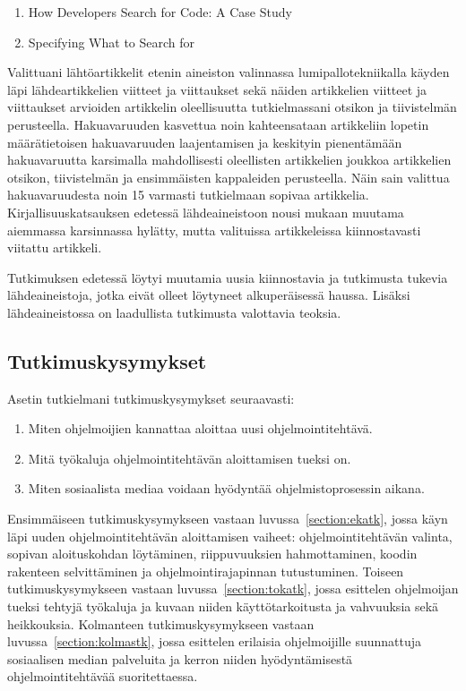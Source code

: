 \documentclass[finnish]{tktltiki2}
\theoremstyle{definition}
\theoremstyle{remark}
\begin{document}
\begin{enumerate}
  \item How Developers Search for Code: A Case Study~\cite{g_search_code}
  \item Specifying What to Search for~\cite{what-to-search-for}
\end{enumerate}
Valittuani lähtöartikkelit etenin aineiston valinnassa lumipallotekniikalla
käyden läpi lähdeartikkelien viitteet ja viittaukset sekä näiden artikkelien viitteet ja viittaukset arvioiden artikkelin oleellisuutta tutkielmassani otsikon ja tiivistelmän perusteella. Hakuavaruuden kasvettua noin kahteensataan artikkeliin lopetin määrätietoisen hakuavaruuden laajentamisen ja keskityin pienentämään hakuavaruutta karsimalla mahdollisesti oleellisten artikkelien joukkoa artikkelien otsikon, tiivistelmän ja ensimmäisten kappaleiden perusteella. Näin sain valittua hakuavaruudesta noin 15 varmasti tutkielmaan sopivaa artikkelia.  Kirjallisuuskatsauksen edetessä lähdeaineistoon nousi mukaan muutama aiemmassa karsinnassa hylätty, mutta valituissa artikkeleissa kiinnostavasti viitattu artikkeli.

Tutkimuksen edetessä löytyi muutamia uusia kiinnostavia ja tutkimusta tukevia lähdeaineistoja, jotka eivät olleet löytyneet alkuperäisessä haussa. Lisäksi lähdeaineistossa on laadullista tutkimusta valottavia teoksia.

\subsection{Tutkimuskysymykset}

Asetin tutkielmani tutkimuskysymykset seuraavasti:

\begin{enumerate}
  \item Miten ohjelmoijien kannattaa aloittaa uusi ohjelmointitehtävä.
  \item Mitä työkaluja ohjelmointitehtävän aloittamisen tueksi on.
  \item Miten sosiaalista mediaa voidaan hyödyntää ohjelmistoprosessin aikana.
\end{enumerate}
Ensimmäiseen tutkimuskysymykseen vastaan luvussa~\ref{section:ekatk}, jossa käyn läpi uuden ohjelmointitehtävän aloittamisen vaiheet: ohjelmointitehtävän valinta, sopivan aloituskohdan löytäminen, riippuvuuksien hahmottaminen, koodin rakenteen selvittäminen ja ohjelmointirajapinnan tutustuminen.
Toiseen tutkimuskysymykseen vastaan luvussa~\ref{section:tokatk}, jossa esittelen ohjelmoijan tueksi tehtyjä työkaluja ja kuvaan niiden käyttötarkoitusta ja vahvuuksia sekä heikkouksia.
Kolmanteen tutkimuskysymykseen vastaan luvussa~\ref{section:kolmastk}, jossa esittelen erilaisia ohjelmoijille suunnattuja sosiaalisen median palveluita ja kerron niiden hyödyntämisestä ohjelmointitehtävää suoritettaessa.
\end{document}
